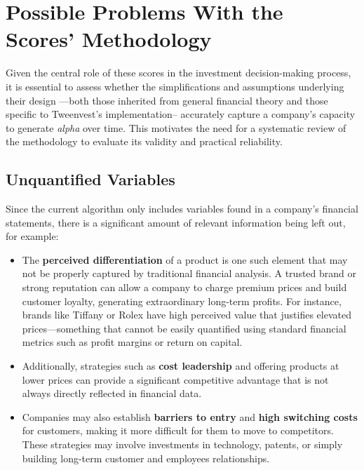 \documentclass[11pt,english,a4paper,hidelinks]{book}
\begin{document}
\section{Possible Problems With the Scores' Methodology}

\noindent Given the central role of these scores in the investment decision-making process, it is essential to assess whether the simplifications and assumptions underlying their design —both those inherited from general financial theory and those specific to Tweenvest’s implementation-- accurately capture a company’s capacity to generate \textit{alpha} over time. This motivates the need for a systematic review of the methodology to evaluate its validity and practical reliability.


\subsection{Unquantified Variables}
\noindent Since the current algorithm only includes variables found in a company's financial statements, there is a significant amount of relevant information being left out, for example:

\begin{itemize}
    \item The \textbf{perceived differentiation} of a product is one such element that may not be properly captured by traditional financial analysis. A trusted brand or strong reputation can allow a company to charge premium prices and build customer loyalty, generating extraordinary long-term profits. For instance, brands like Tiffany or Rolex have high perceived value that justifies elevated prices—something that cannot be easily quantified using standard financial metrics such as profit margins or return on capital.

    \item Additionally, strategies such as \textbf{cost leadership} and offering products at lower prices can provide a significant competitive advantage that is not always directly reflected in financial data.

    \item Companies may also establish \textbf{barriers to entry} and \textbf{high switching costs} for customers, making it more difficult for them to move to competitors. These strategies may involve investments in technology, patents, or simply building long-term customer and employees relationships.
\end{itemize}
\end{document}
